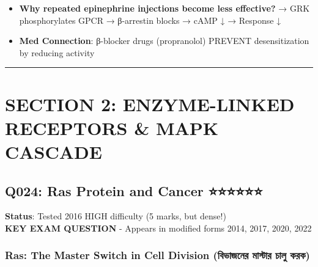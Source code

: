 \begin{itemize}
\tightlist
\item
  \textbf{Why repeated epinephrine injections become less effective?} →
  GRK phosphorylates GPCR → β-arrestin blocks → cAMP ↓ → Response ↓
\item
  \textbf{Med Connection}: β-blocker drugs (propranolol) PREVENT
  desensitization by reducing activity
\end{itemize}

\begin{center}\rule{0.5\linewidth}{0.5pt}\end{center}

\hypertarget{section-2-enzyme-linked-receptors-mapk-cascade}{%
\chapter{SECTION 2: ENZYME-LINKED RECEPTORS \& MAPK
CASCADE}\label{section-2-enzyme-linked-receptors-mapk-cascade}}

\hypertarget{q024-ras-protein-and-cancer}{%
\section{Q024: Ras Protein and Cancer
⭐⭐⭐⭐⭐⭐}\label{q024-ras-protein-and-cancer}}

\textbf{Status}: Tested 2016 \textbar{} HIGH difficulty (5 marks, but
dense!)\\
\textbf{KEY EXAM QUESTION} - Appears in modified forms 2014, 2017, 2020,
2022

\hypertarget{ras-the-master-switch-in-cell-division-ux9acux9adux99cux9a8ux9b0-ux9aeux9b8ux99fux9b0-ux99aux9b2-ux995ux9b0ux995}{%
\subsection{\texorpdfstring{\textbf{Ras: The Master Switch in Cell
Division (বিভাজনের মাস্টার চালু
করক)}}{Ras: The Master Switch in Cell Division (বিভাজনের মাস্টার চালু করক)}}\label{ras-the-master-switch-in-cell-division-ux9acux9adux99cux9a8ux9b0-ux9aeux9b8ux99fux9b0-ux99aux9b2-ux995ux9b0ux995}}

